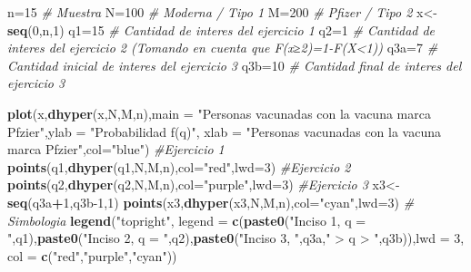 \documentclass[
]{article}
\newenvironment{Shaded}{\begin{snugshade}}{\end{snugshade}}
\newcommand{\AttributeTok}[1]{\textcolor[rgb]{0.13,0.29,0.53}{#1}}
\newcommand{\CommentTok}[1]{\textcolor[rgb]{0.56,0.35,0.01}{\textit{#1}}}
\newcommand{\DecValTok}[1]{\textcolor[rgb]{0.00,0.00,0.81}{#1}}
\newcommand{\FunctionTok}[1]{\textcolor[rgb]{0.13,0.29,0.53}{\textbf{#1}}}
\newcommand{\NormalTok}[1]{#1}
\newcommand{\OtherTok}[1]{\textcolor[rgb]{0.56,0.35,0.01}{#1}}
\newcommand{\SpecialCharTok}[1]{\textcolor[rgb]{0.81,0.36,0.00}{\textbf{#1}}}
\newcommand{\StringTok}[1]{\textcolor[rgb]{0.31,0.60,0.02}{#1}}
\begin{document}
\begin{Shaded}
\begin{Highlighting}[]
\NormalTok{n}\OtherTok{=}\DecValTok{15} \CommentTok{\# Muestra}
\NormalTok{N}\OtherTok{=}\DecValTok{100} \CommentTok{\# Moderna / Tipo 1}
\NormalTok{M}\OtherTok{=}\DecValTok{200} \CommentTok{\# Pfizer / Tipo 2}
\NormalTok{x}\OtherTok{\textless{}{-}}\FunctionTok{seq}\NormalTok{(}\DecValTok{0}\NormalTok{,n,}\DecValTok{1}\NormalTok{)}
\NormalTok{q1}\OtherTok{=}\DecValTok{15} \CommentTok{\# Cantidad de interes del ejercicio 1}
\NormalTok{q2}\OtherTok{=}\DecValTok{1} \CommentTok{\# Cantidad de interes del ejercicio 2 (Tomando en cuenta que F(x≥2)=1{-}F(X\textless{}1))}
\NormalTok{q3a}\OtherTok{=}\DecValTok{7} \CommentTok{\# Cantidad inicial de interes del ejercicio 3}
\NormalTok{q3b}\OtherTok{=}\DecValTok{10} \CommentTok{\# Cantidad final de interes del ejercicio 3}

\FunctionTok{plot}\NormalTok{(x,}\FunctionTok{dhyper}\NormalTok{(x,N,M,n),}\AttributeTok{main =} \StringTok{"Personas vacunadas con la vacuna marca Pfzier"}\NormalTok{,}\AttributeTok{ylab =} \StringTok{"Probabilidad f(q)"}\NormalTok{, }\AttributeTok{xlab =} \StringTok{"Personas vacunadas con la vacuna marca Pfzier"}\NormalTok{,}\AttributeTok{col=}\StringTok{"blue"}\NormalTok{)}
\CommentTok{\#Ejercicio 1}
\FunctionTok{points}\NormalTok{(q1,}\FunctionTok{dhyper}\NormalTok{(q1,N,M,n),}\AttributeTok{col=}\StringTok{"red"}\NormalTok{,}\AttributeTok{lwd=}\DecValTok{3}\NormalTok{)}
\CommentTok{\#Ejercicio 2}
\FunctionTok{points}\NormalTok{(q2,}\FunctionTok{dhyper}\NormalTok{(q2,N,M,n),}\AttributeTok{col=}\StringTok{"purple"}\NormalTok{,}\AttributeTok{lwd=}\DecValTok{3}\NormalTok{)}
\CommentTok{\#Ejercicio 3}
\NormalTok{x3}\OtherTok{\textless{}{-}}\FunctionTok{seq}\NormalTok{(q3a}\SpecialCharTok{+}\DecValTok{1}\NormalTok{,q3b}\DecValTok{{-}1}\NormalTok{,}\DecValTok{1}\NormalTok{)}
\FunctionTok{points}\NormalTok{(x3,}\FunctionTok{dhyper}\NormalTok{(x3,N,M,n),}\AttributeTok{col=}\StringTok{"cyan"}\NormalTok{,}\AttributeTok{lwd=}\DecValTok{3}\NormalTok{)}
\CommentTok{\# Simbologia}
\FunctionTok{legend}\NormalTok{(}\StringTok{"topright"}\NormalTok{, }\AttributeTok{legend =} \FunctionTok{c}\NormalTok{(}\FunctionTok{paste0}\NormalTok{(}\StringTok{"Inciso 1, q = "}\NormalTok{,q1),}\FunctionTok{paste0}\NormalTok{(}\StringTok{"Inciso 2, q = "}\NormalTok{,q2),}\FunctionTok{paste0}\NormalTok{(}\StringTok{"Inciso 3, "}\NormalTok{,q3a,}\StringTok{" \textgreater{} q \textgreater{} "}\NormalTok{,q3b)),}\AttributeTok{lwd =} \DecValTok{3}\NormalTok{, }\AttributeTok{col =} \FunctionTok{c}\NormalTok{(}\StringTok{"red"}\NormalTok{,}\StringTok{"purple"}\NormalTok{,}\StringTok{"cyan"}\NormalTok{))}
\end{Highlighting}
\end{Shaded}
\end{document}
